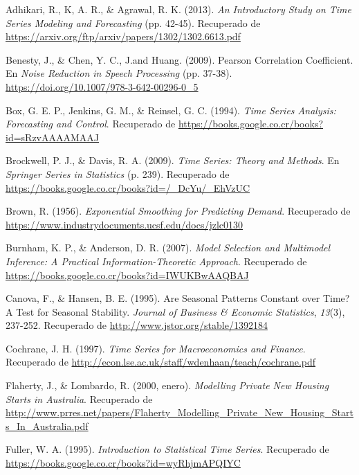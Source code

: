 \documentclass[
]{article}
\newlength{\cslhangindent}
\newenvironment{cslreferences}%
  {\setlength{\parindent}{0pt}%
  \everypar{\setlength{\hangindent}{\cslhangindent}}\ignorespaces}%
  {\par}
\begin{document}
\hypertarget{refs}{}
\begin{cslreferences}
\leavevmode\hypertarget{ref-medidas}{}%
Adhikari, R., K, A. R., \& Agrawal, R. K. (2013). \emph{An Introductory
Study on Time Series Modeling and Forecasting} (pp. 42-45). Recuperado
de \url{https://arxiv.org/ftp/arxiv/papers/1302/1302.6613.pdf}

\leavevmode\hypertarget{ref-pearson}{}%
Benesty, J., \& Chen, Y. C., J.and Huang. (2009). Pearson Correlation
Coefficient. En \emph{Noise Reduction in Speech Processing} (pp. 37-38).
\url{https://doi.org/10.1007/978-3-642-00296-0_5}

\leavevmode\hypertarget{ref-box-jenkins}{}%
Box, G. E. P., Jenkins, G. M., \& Reinsel, G. C. (1994). \emph{Time
Series Analysis: Forecasting and Control}. Recuperado de
\url{https://books.google.co.cr/books?id=sRzvAAAAMAAJ}

\leavevmode\hypertarget{ref-yule.walker}{}%
Brockwell, P. J., \& Davis, R. A. (2009). \emph{Time Series: Theory and
Methods}. En \emph{Springer Series in Statistics} (p. 239). Recuperado
de \url{https://books.google.co.cr/books?id=/_DcYu/_EhVzUC}

\leavevmode\hypertarget{ref-brown}{}%
Brown, R. (1956). \emph{Exponential Smoothing for Predicting Demand}.
Recuperado de \url{https://www.industrydocuments.ucsf.edu/docs/jzlc0130}

\leavevmode\hypertarget{ref-burnham2007model}{}%
Burnham, K. P., \& Anderson, D. R. (2007). \emph{Model Selection and
Multimodel Inference: A Practical Information-Theoretic Approach}.
Recuperado de \url{https://books.google.co.cr/books?id=IWUKBwAAQBAJ}

\leavevmode\hypertarget{ref-10.2307ux2f1392184}{}%
Canova, F., \& Hansen, B. E. (1995). Are Seasonal Patterns Constant over
Time? A Test for Seasonal Stability. \emph{Journal of Business \&
Economic Statistics}, \emph{13}(3), 237-252. Recuperado de
\url{http://www.jstor.org/stable/1392184}

\leavevmode\hypertarget{ref-Cochrane}{}%
Cochrane, J. H. (1997). \emph{Time Series for Macroeconomics and
Finance}. Recuperado de
\url{http://econ.lse.ac.uk/staff/wdenhaan/teach/cochrane.pdf}

\leavevmode\hypertarget{ref-Lombardo}{}%
Flaherty, J., \& Lombardo, R. (2000, enero). \emph{Modelling Private New
Housing Starts in Australia}. Recuperado de
\url{http://www.prres.net/papers/Flaherty_Modelling_Private_New_Housing_Starts_In_Australia.pdf}

\leavevmode\hypertarget{ref-fuller1995introduction}{}%
Fuller, W. A. (1995). \emph{Introduction to Statistical Time Series}.
Recuperado de \url{https://books.google.co.cr/books?id=wyRhjmAPQIYC}


\end{cslreferences}
\end{document}

